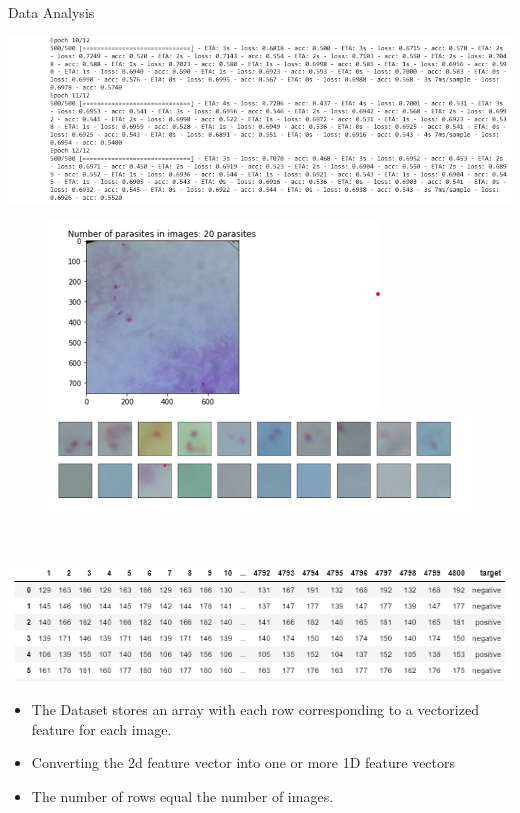 \documentclass{beamer}
\begin{document}
\begin{frame}[t]{Data Analysis}
		\begin{block}{\color{red}{Model Performance}}
		\includegraphics[scale = 0.5]{cnn_model.png}
		\begin{figure}[H]
			\begin{minipage}{\textwidth}
				\centering
				\includegraphics[width=.4\textwidth]{para_in_image.png}
				\includegraphics[width=.5\textwidth]{parasites.png}
				\label{fig:qq_plot}
			\end{minipage}\\[1em]
		\end{figure}
	\end{block}
\end{frame}
	
		\begin{frame}
		\begin{block}{\color{red}{The Data}}
			\includegraphics[scale = 0.6]{data_head.png}
			
			\begin{itemize}
			\item The Dataset stores an array with each row corresponding to a vectorized feature for each image.
			\item Converting the 2d feature vector into one or more 1D feature vectors
			\item The number of rows equal the number of images.
			\end{itemize}
			
		\end{block}
	\end{frame}
	
\end{document}
